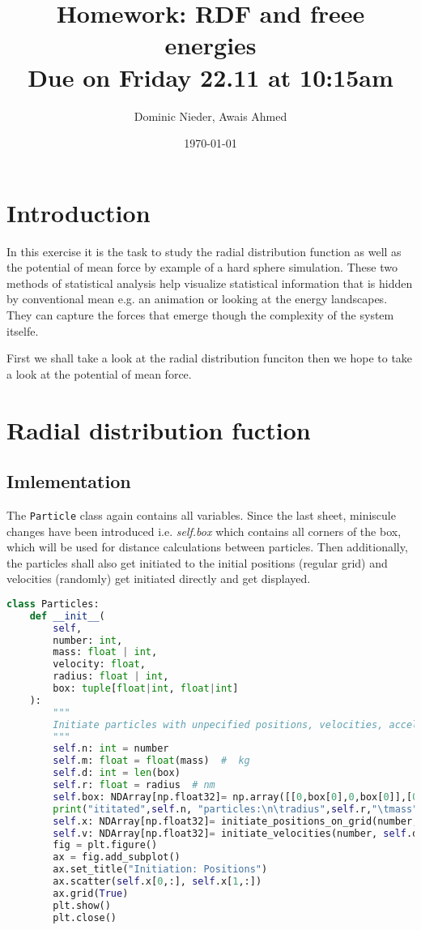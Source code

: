 \documentclass{article}[a4paper]
\title{
    \vspace{2in}
    \textmd{\textbf{Homework: RDF and freee energies}}\\
    \normalsize\vspace{0.1in}\small{Due on Friday 22.11 at 10:15am}\\
    \vspace{0.1in}
    \vspace{3in}
}
\author{Dominic Nieder, Awais Ahmed}
\date{\today}
\begin{document}
\section{Introduction}
In this exercise it is the task to study the radial distribution function as well as the potential of mean force by example of a hard sphere simulation. These two methods of statistical analysis help visualize statistical information that is hidden by conventional mean e.g. an animation or looking at the energy landscapes. They can capture the forces that emerge though the complexity of the system itselfe.

First we shall take a look at the radial distribution funciton then we hope to take a look at the potential of mean force.

\section{Radial distribution fuction}
\subsection{Imlementation}

The \texttt{Particle} class again contains all variables. 
Since the last sheet, miniscule changes have been introduced i.e. \textit{self.box} which contains all corners of the box, which will be used for distance calculations between particles. 
Then additionally, the particles shall also get initiated to the initial positions (regular grid) and velocities (randomly) get initiated directly and get displayed.
\begin{lstlisting}[language=Python]
class Particles:
    def __init__(
        self,
        number: int,
        mass: float | int,
        velocity: float,
        radius: float | int,
        box: tuple[float|int, float|int]
    ):
        """
        Initiate particles with unpecified positions, velocities, accelerations.
        """
        self.n: int = number
        self.m: float = float(mass)  #  kg
        self.d: int = len(box)
        self.r: float = radius  # nm
        self.box: NDArray[np.float32]= np.array([[0,box[0],0,box[0]],[0,0,box[1],box[1]]])  # nm
        print("ititated",self.n, "particles:\n\tradius",self.r,"\tmass",self.m,"\tdimensions",self.d)
        self.x: NDArray[np.float32]= initiate_positions_on_grid(number,box) 
        self.v: NDArray[np.float32]= initiate_velocities(number, self.d, velocity)
        fig = plt.figure()
        ax = fig.add_subplot()
        ax.set_title("Initiation: Positions")
        ax.scatter(self.x[0,:], self.x[1,:])
        ax.grid(True)
        plt.show()      
        plt.close()
\end{lstlisting}
\end{document}

